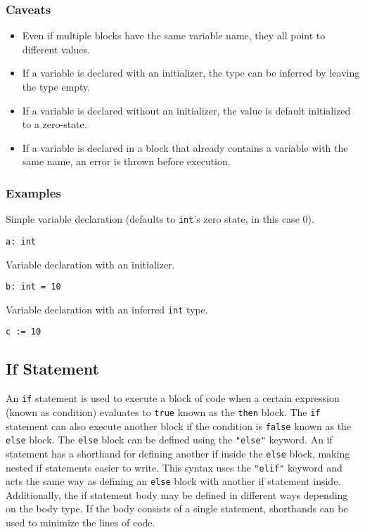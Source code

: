 \subsubsection{Caveats}

\begin{itemize}
    \item Even if multiple blocks have the same variable name, they all point to different values.
    \item If a variable is declared with an initializer, the type can be inferred by leaving the type empty.
    \item If a variable is declared without an initializer, the value is default initialized to a zero-state.
    \item If a variable is declared in a block that already contains a variable with the same name, an error is thrown before execution.
\end{itemize}

\subsubsection{Examples}

Simple variable declaration (defaults to \texttt{int}'s zero state, in this case 0).
\begin{lstlisting}
a: int
\end{lstlisting}
Variable declaration with an initializer.
\begin{lstlisting}
b: int = 10
\end{lstlisting}
Variable declaration with an inferred \texttt{int} type.
\begin{lstlisting}
c := 10
\end{lstlisting}

\subsection{If Statement}

An \texttt{if} statement is used to execute a block of code when a certain expression (known as condition) evaluates
to \texttt{true} known as the \texttt{then} block.
The \texttt{if} statement can also execute another block if the condition is \texttt{false} known as the \texttt{else} block.
The \texttt{else} block can be defined using the \texttt{"else"} keyword.
An if statement has a shorthand for defining another if inside the \texttt{else} block, making nested if statements easier to write.
This syntax uses the \texttt{"elif"} keyword and acts the same way as defining an \texttt{else} block with another if statement inside.
Additionally, the if statement body may be defined in different ways depending on the body type. If the body consists of a single statement,
shorthands can be used to minimize the lines of code.

